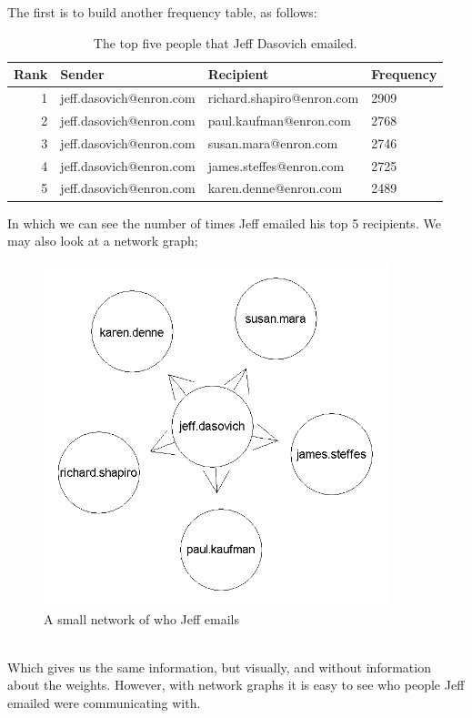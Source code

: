 \documentclass[12pt, a4paper, oneside]{amsart}
\begin{document}
The first is to build another frequency table, as follows:
\begin{table}[h]
\begin{center}
\begin{tabular}{|r|l|l|l|}
  \hline
Rank & Sender & Recipient & Frequency \\ 
  \hline
 1 & jeff.dasovich@enron.com & richard.shapiro@enron.com & 2909 \\ 
  2 & jeff.dasovich@enron.com & paul.kaufman@enron.com & 2768 \\ 
  3 & jeff.dasovich@enron.com & susan.mara@enron.com & 2746 \\ 
  4 & jeff.dasovich@enron.com & james.steffes@enron.com & 2725 \\ 
  5 & jeff.dasovich@enron.com & karen.denne@enron.com & 2489 \\ 
   \hline
\end{tabular}
\caption{The top five people that Jeff Dasovich emailed.}
\label{table:allLibs}
\end{center}
\end{table}
In which we can see the number of times Jeff emailed his top 5 recipients.  We may also look at a network graph;
\begin{figure}[htp]
\centering
\includegraphics[width = 100mm]{JeffPlot.jpeg}
\caption{A small network of who Jeff emails}\label{fig:JeffNetwork}
\end{figure}\\
Which gives us the same information, but visually, and without information about the weights.  However, with network graphs it is easy to see who people Jeff emailed were communicating with.  
\end{document}
